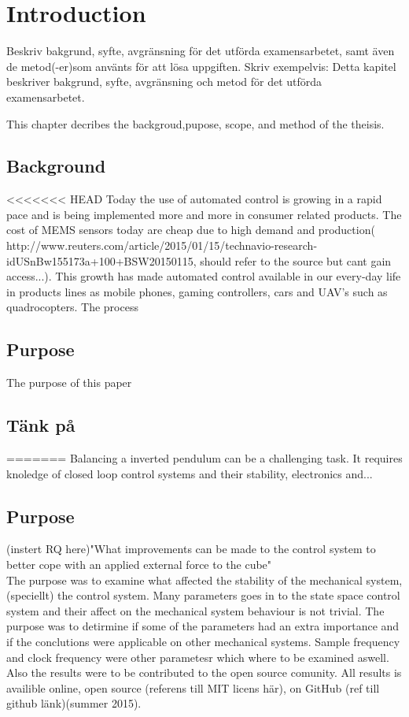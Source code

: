 \documentclass[a4paper,11pt]{kth-mag}
\begin{document}
\mainmatter
\pagestyle{newchap}

\chapter{Introduction}
Beskriv bakgrund, syfte, avgränsning för det utförda examensarbetet, samt även de  metod(-er)som använts för att lösa uppgiften. Skriv exempelvis: Detta kapitel beskriver bakgrund, syfte, avgränsning och metod för det utförda examensarbetet.

This chapter decribes the backgroud,pupose, scope, and method of the theisis. 
\section{Background}
<<<<<<< HEAD
Today the use of automated control is growing in a rapid pace and is being implemented more and more in consumer related products. The cost of MEMS sensors today are cheap due to high demand and production( http://www.reuters.com/article/2015/01/15/technavio-research-idUSnBw155173a+100+BSW20150115, should refer to the source but cant gain access...). This growth has made automated control available in our every-day life in products lines as mobile phones, gaming controllers, cars and UAV's such as quadrocopters. The process 
\section{Purpose}
The purpose of this paper 
\section{Tänk på}
=======
Balancing a inverted pendulum can be a challenging task. It requires knoledge of closed loop control systems and their stability, electronics and... 

\section{Purpose}

(instert RQ here)"What improvements can be made to the control system to better cope with an applied external force to the cube"  \\

\noindent{}The purpose was to examine what affected the stability of the mechanical system, (speciellt) the control system. Many parameters goes in to the state space control system and their affect on the mechanical system behaviour is not trivial. The purpose was to detirmine if some of the parameters had an extra importance and if the conclutions were applicable on other mechanical systems. Sample frequency and clock frequency were other parametesr which where to be examined aswell. Also the results were to be contributed to the open source comunity. All results is availible online, open source (referens till MIT licens här), on GitHub (ref till github länk)(summer 2015).\\  
\end{document}
